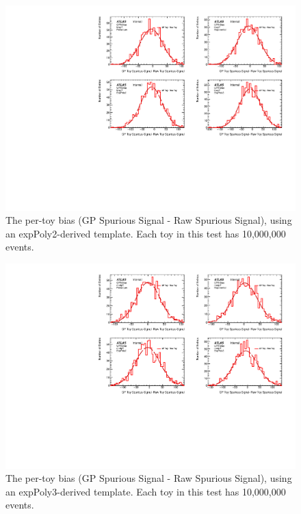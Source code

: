 \begin{figure} 
\begin{center}
  \includegraphics[width=\textwidth]{figures/background/gpr/validation/nominal/ToyTest_FitSigBiases_lowpT_10M_noSig}   
\caption{The per-toy bias (GP Spurious Signal - Raw Spurious Signal), using an expPoly2-derived template. Each toy in this test has 10,000,000 events.}
\label{fig:bias_lowpt_10M_noSig}
\end{center}
\end{figure}

\begin{figure} 
\begin{center}
  \includegraphics[width=\textwidth]{figures/background/gpr/validation/nominal/ToyTest_FitSigBiases_medpT_10M_noSig}   
\caption{The per-toy bias (GP Spurious Signal - Raw Spurious Signal), using an expPoly3-derived template. Each toy in this test has 10,000,000 events.}
\label{fig:bias_medpt_10M_noSig}
\end{center}
\end{figure}

